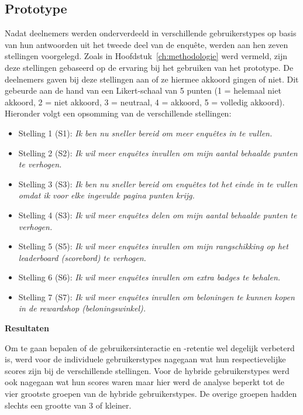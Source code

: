 \subsection{Prototype}

Nadat deelnemers werden onderverdeeld in verschillende gebruikerstypes op basis van hun antwoorden uit het tweede deel van de enquête, werden aan hen zeven stellingen voorgelegd. Zoals in Hoofdstuk~\ref{ch:methodologie} werd vermeld, zijn deze stellingen gebaseerd op de ervaring bij het gebruiken van het prototype. De deelnemers gaven bij deze stellingen aan of ze hiermee akkoord gingen of niet. Dit gebeurde aan de hand van een Likert-schaal van 5 punten (1 = helemaal niet akkoord, 2 = niet akkoord, 3 = neutraal, 4 = akkoord, 5 = volledig akkoord). Hieronder volgt een opsomming van de verschillende stellingen:

\begin{itemize}
    \item Stelling 1 (S1): \textit{Ik ben nu sneller bereid om meer enquêtes in te vullen.}
    \item Stelling 2 (S2): \textit{Ik wil meer enquêtes invullen om mijn aantal behaalde punten te verhogen.}
    \item Stelling 3 (S3): \textit{Ik ben nu sneller bereid om enquêtes tot het einde in te vullen omdat ik voor elke ingevulde pagina punten krijg.}
    \item Stelling 4 (S3): \textit{Ik wil meer enquêtes delen om mijn aantal behaalde punten te verhogen.}
    \item Stelling 5 (S5): \textit{Ik wil meer enquêtes invullen om mijn rangschikking op het leaderboard (scorebord) te verhogen.}
    \item Stelling 6 (S6): \textit{Ik wil meer enquêtes invullen om extra badges te behalen.}
    \item Stelling 7 (S7): \textit{Ik wil meer enquêtes invullen om beloningen te kunnen kopen in de rewardshop (beloningswinkel).}
\end{itemize}

\textbf{Resultaten}

Om te gaan bepalen of de gebruikersinteractie en -retentie wel degelijk verbeterd is, werd voor de individuele gebruikerstypes nagegaan wat hun respectievelijke scores zijn bij de verschillende stellingen. Voor de hybride gebruikerstypes werd ook nagegaan wat hun scores waren maar hier werd de analyse beperkt tot de vier grootste groepen van de hybride gebruikerstypes. De overige groepen hadden slechts een grootte van 3 of kleiner.

